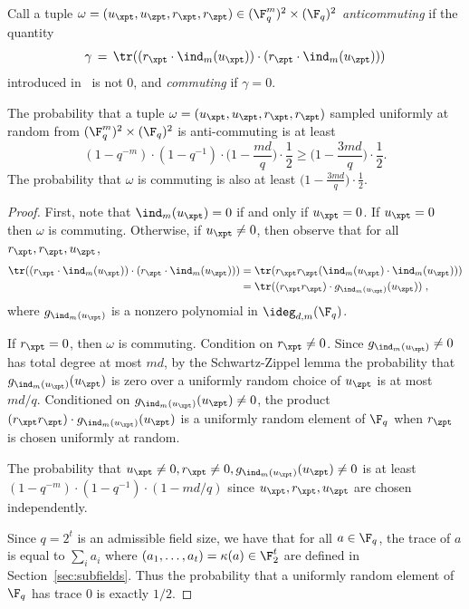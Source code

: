 Call a tuple $\omega = (u_\xpt,u_\zpt,r_\xpt,r_\zpt) \in (\F_q^m)^2
\times (\F_q)^2$ \emph{anticommuting} if the quantity 
 \[\gamma\,=\,\tr ((r_\xpt \cdot
\ind_m(u_\xpt)) \cdot (r_\zpt \cdot \ind_m(u_\zpt)))\]
introduced in~ is not $0$, and \emph{commuting} if $\gamma=0$.

\begin{fact}
\label{fact:omega-anticomm-prob}
	The probability that a tuple $\omega= (u_\xpt,u_\zpt,r_\xpt,r_\zpt)$ sampled uniformly at random from $(\F_q^m)^2 \times (\F_q)^2$
	is anti-commuting is at least 
	\[
		(1 - q^{-m}) \cdot (1 - q^{-1}) \cdot \Big (1 - \frac{md}{q} \Big )  \cdot \frac{1}{2} \geq \Big (1 - \frac{3md}{q} \Big ) \cdot \frac{1}{2}.
	\]
	The probability that $\omega$ is commuting is also at least $\Big(1 - \frac{3md}{q} \Big ) \cdot \frac{1}{2}$.
\end{fact}
\begin{proof}
	First, note that $\ind_m(u_\xpt) = 0$ if and only if $u_\xpt = 0$. If $u_\xpt=0$ then $\omega$ is commuting. Otherwise, if $u_\xpt \neq 0$, then observe that for all $r_\xpt, r_\zpt, u_\zpt$,
	\begin{align*}
		\tr( (r_\xpt \cdot \ind_m(u_\xpt)) \cdot (r_\zpt \cdot
                \ind_m(u_\zpt))) &= \tr( r_\xpt r_\zpt (\ind_m(u_\xpt) \cdot \ind_m(u_\zpt))) \\
								&= \tr( (r_\xpt r_\zpt) \cdot g_{\ind_m(u_\xpt)}(u_\zpt))\;,
	\end{align*}
	where $g_{\ind_m(u_\xpt)}$ is a nonzero polynomial in $\ideg_{d,m}(\F_q)$.
	
	If $r_\xpt = 0$, then $\omega$ is commuting. Condition on $r_\xpt \neq 0$.  Since $g_{\ind_m(u_\xpt)}\neq 0$ has total degree at most $md$, by the Schwartz-Zippel lemma the probability that $g_{\ind_m(u_\xpt)}(u_\zpt)$ is zero over a uniformly random choice of $u_\zpt$ is at most $md/q$. Conditioned on $g_{\ind_m(u_\xpt)}(u_\zpt) \neq 0$, the product $(r_\xpt r_\zpt) \cdot g_{\ind_m(u_\xpt)}(u_\zpt)$ is a uniformly random element of $\F_q$ when $r_\zpt$ is chosen uniformly at random. 
	
	The probability that $u_\xpt \neq 0, r_\xpt \neq 0, g_{\ind_m(u_\xpt)}(u_\zpt) \neq 0$ is at least $(1 - q^{-m}) \cdot (1 - q^{-1}) \cdot (1 - md/q)$ since $u_\xpt, r_\xpt, u_\zpt$ are chosen independently.
	
	Since $q = 2^t$ is an admissible field size, we have that for all $a \in \F_q$, the trace of $a$ is equal to $\sum_i a_i$ where $(a_1,\ldots,a_t)=\kappa(a) \in \F_2^t$ are defined in Section~\ref{sec:subfields}. Thus the probability that a uniformly random element of $\F_q$ has trace $0$ is exactly $1/2$. 
\end{proof}

